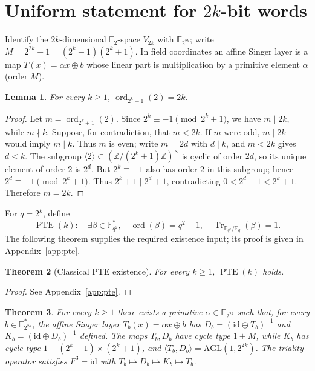 \documentclass[11pt]{article}
\newtheorem{theorem}{Theorem}[section]
\newtheorem{lemma}[theorem]{Lemma}
\begin{document}
\section[Uniform statement for 2k-bit words]{Uniform statement for $2k$-bit words}\label{sec:2k}
Identify the $2k$-dimensional $\mathbb F_2$-space $V_{2k}$ with
$\mathbb{F}_{2^{2k}}$; write $M=2^{2k}-1=(2^k-1)(2^k+1)$. In field
coordinates an affine Singer layer is a map $T(x)=\alpha x\oplus b$ whose linear part
is multiplication by a primitive element $\alpha$ (order $M$).
\begin{lemma}\label{lem:ord}
For every $k\ge1$, $\operatorname{ord}_{2^k+1}(2)=2k$.
\end{lemma}
\begin{proof}
Let $m=\operatorname{ord}_{2^k+1}(2)$. Since $2^k\equiv-1\pmod{2^k+1}$,
we have $m\mid2k$, while $m\nmid k$. Suppose, for contradiction, that
$m<2k$. If $m$ were odd, $m\mid2k$ would imply $m\mid k$.
Thus $m$ is even; write $m=2d$
with $d\mid k$, and $m<2k$ gives $d<k$. The subgroup
$\langle2\rangle\subset(\mathbb Z/(2^k+1)\mathbb Z)^\times$ is cyclic of order
$2d$, so its unique element of order $2$ is $2^d$. But $2^k\equiv-1$ also has
order $2$ in this subgroup; hence $2^d\equiv-1\pmod{2^k+1}$. Thus
$2^k+1\mid 2^d+1$, contradicting
$0<2^d+1<2^k+1$. Therefore $m=2k$.
\end{proof}
For \(q=2^k\), define
\[
\operatorname{PTE}(k):\quad
\exists\beta\in\mathbb{F}_{q^2}^*,\quad
\operatorname{ord}(\beta)=q^2-1,\quad
\operatorname{Tr}_{\mathbb{F}_{q^2}/\mathbb{F}_q}(\beta)=1.
\]
The following theorem supplies the required existence input; its proof is given in Appendix~\ref{app:pte}.
\begin{samepage}
\begin{theorem}[Classical PTE existence]\label{thm:pte}
For every \(k\ge1\), \(\operatorname{PTE}(k)\) holds.
\end{theorem}
\begin{proof}
See Appendix~\ref{app:pte}.
\end{proof}
\end{samepage}
\begin{theorem}\label{thm:2k}
For every $k\ge1$ there exists a primitive $\alpha\in\mathbb F_{2^{2k}}$
such that, for every $b\in\mathbb F_{2^{2k}}^*$, the affine Singer layer
$T_b(x)=\alpha x\oplus b$ has
$D_b=(\mathrm{id}\oplus T_b)^{-1}$ and $K_b=(\mathrm{id}\oplus D_b)^{-1}$ defined.
The maps $T_b,D_b$ have cycle type $1+M$, while $K_b$ has cycle type
$1+(2^k-1)\times(2^k+1)$, and $\langle T_b,D_b\rangle=\mathrm{AGL}(1,2^{2k})$.
The triality operator satisfies $F^3=\mathrm{id}$ with
$T_b\mapsto D_b\mapsto K_b\mapsto T_b$.
\end{theorem}
\end{document}
